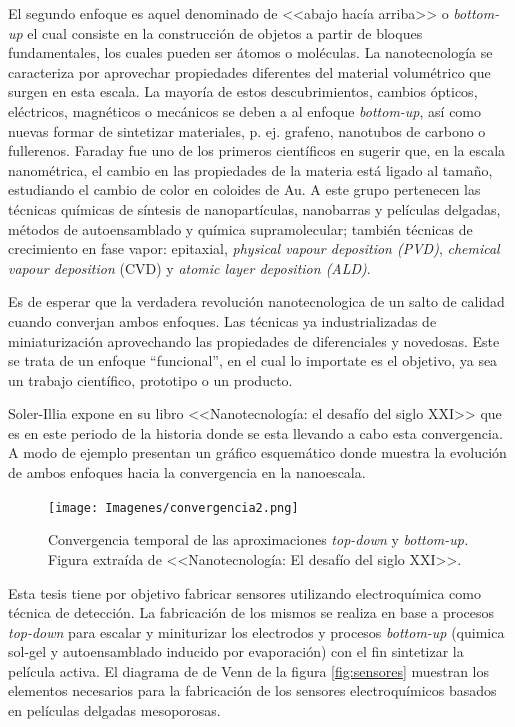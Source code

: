 	El segundo enfoque es aquel denominado de <<abajo hacía arriba>> o \textit{bottom-up} el cual consiste en la construcción de objetos a partir de bloques fundamentales, los cuales pueden ser átomos o moléculas. La nanotecnología se caracteriza por aprovechar propiedades diferentes del material volumétrico que surgen en esta escala. La mayoría de estos descubrimientos, cambios ópticos, eléctricos, magnéticos o mecánicos se deben a al enfoque \textit{bottom-up}, así como nuevas formar de sintetizar materiales, p. ej. grafeno, nanotubos de carbono o fullerenos. Faraday fue uno de los primeros científicos en sugerir que, en la escala nanométrica, el cambio en las propiedades de la materia está ligado al tamaño, estudiando el cambio de color en coloides de Au\cite{faraday1857}. A este grupo pertenecen las técnicas químicas de síntesis de nanopartículas, nanobarras y películas delgadas, métodos de autoensamblado y química supramolecular; también técnicas de crecimiento en fase vapor: epitaxial, \textit{physical vapour deposition (PVD)}, \textit{chemical vapour deposition} (CVD) y \textit{atomic layer deposition (ALD)}.
			
	Es de esperar que la verdadera revolución nanotecnologica de un salto de calidad cuando converjan ambos enfoques. Las técnicas ya industrializadas de miniaturización aprovechando las propiedades de diferenciales y novedosas. Este se trata de un enfoque ``funcional'', en el cual lo importate es el objetivo, ya sea un trabajo científico, prototipo o un producto.

	Soler-Illia expone en su libro <<Nanotecnología: el desafío del siglo XXI>>\cite{nanotecnologia-galo} que es en este periodo de la historia donde se esta llevando a cabo esta convergencia. A modo de ejemplo presentan un gráfico esquemático donde muestra la evolución de ambos enfoques hacia la convergencia en la nanoescala.

			\begin{figure}[ht!]
 				\begin{center}
 				\texttt{[image: Imagenes/convergencia2.png]}
 				\caption[Convergencia \textit{top-down }y \textit{bottom-up.}]{Convergencia temporal de las aproximaciones \textit{top-down }y \textit{bottom-up.} Figura extraída de <<Nanotecnología: El desafío del siglo XXI>>.}
 				\label{fig:galo-convergencia}
 		   	    \end{center}
 		   	    \end{figure}

    Esta tesis tiene por objetivo fabricar sensores utilizando electroquímica como técnica de detección. La fabricación de los mismos se realiza en base a procesos \textit{top-down} para escalar y miniturizar los electrodos y procesos \textit{bottom-up} (quimica sol-gel y autoensamblado inducido por evaporación) con el fin sintetizar la película activa. El diagrama de  de Venn de la figura \ref{fig:sensores} muestran los elementos necesarios para la fabricación de los sensores electroquímicos basados en películas delgadas mesoporosas. 
	
